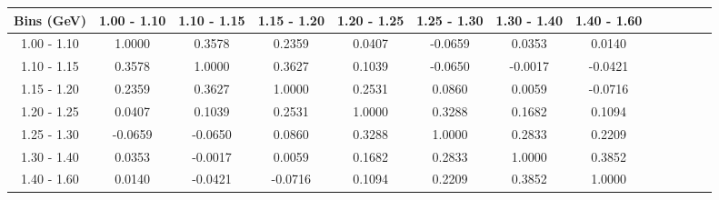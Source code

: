 \documentclass[aps, prd, reprint,showpacs,  preprintnumbers,amsmath,amssymb,superscriptaddress, nofootinbib]{revtex4-1}
\makeatletter
\renewenvironment{table}
  {\def\@captype{table}}
  {}
\makeatother
\begin{document}
\begin{table}
\begin{tabular}{ccccccccccccc}
\hline
    Bins (GeV) &  1.00 - 1.10 &  1.10 - 1.15 &  1.15 - 1.20 &  1.20 - 1.25 &  1.25 - 1.30 &  1.30 - 1.40 &  1.40 - 1.60 \\ 
\hline
  1.00 -  1.10  & 1.0000  & 0.3578  & 0.2359  & 0.0407  &-0.0659  & 0.0353  & 0.0140 \\
  1.10 -  1.15  & 0.3578  & 1.0000  & 0.3627  & 0.1039  &-0.0650  &-0.0017  &-0.0421 \\
  1.15 -  1.20  & 0.2359  & 0.3627  & 1.0000  & 0.2531  & 0.0860  & 0.0059  &-0.0716 \\
  1.20 -  1.25  & 0.0407  & 0.1039  & 0.2531  & 1.0000  & 0.3288  & 0.1682  & 0.1094 \\
  1.25 -  1.30  &-0.0659  &-0.0650  & 0.0860  & 0.3288  & 1.0000  & 0.2833  & 0.2209 \\
  1.30 -  1.40  & 0.0353  &-0.0017  & 0.0059  & 0.1682  & 0.2833  & 1.0000  & 0.3852 \\
  1.40 -  1.60  & 0.0140  &-0.0421  &-0.0716  & 0.1094  & 0.2209  & 0.3852  & 1.0000 \\
\hline
\hline
\end{tabular}
\caption{Correlation matrix for bins of $d\sigma/dM(p\pi^{0})$.\\
NOTE: Result is for the $\Delta$-enriched subsample with $T_{p}>100$\,MeV and $W<1.4$\,GeV.}
\label{tb:piz-Mppiz-cov-W14}
\end{table}

\vspace{0.3cm}
\end{document}
